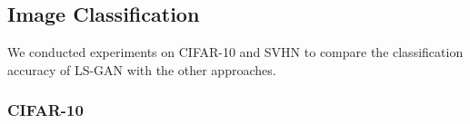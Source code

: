 \subsection{Image Classification}
We conducted experiments on CIFAR-10 and SVHN to compare the classification accuracy of LS-GAN with the other approaches.


\subsubsection{CIFAR-10}



